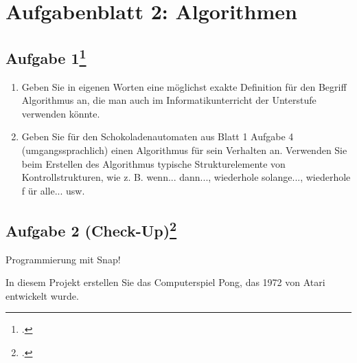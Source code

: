 \documentclass{lehramt-informatik-haupt}
\begin{document}
\chapter{Aufgabenblatt 2: Algorithmen}

%

\section{Aufgabe 1\footcite{oomup:ab:2}}

\begin{enumerate}


\item Geben Sie in eigenen Worten eine möglichst exakte Definition für
den Begriff Algorithmus an, die man auch im Informatikunterricht der
Unterstufe verwenden könnte.


\item Geben Sie für den Schokoladenautomaten aus Blatt 1 Aufgabe 4
(umgangssprachlich) einen Algorithmus für sein Verhalten an. Verwenden
Sie beim Erstellen des Algorithmus typische Strukturelemente von
Kontrollstrukturen, wie z. B. wenn... dann..., wiederhole solange...,
wiederhole f ür alle... usw.
\end{enumerate}

%

\section{Aufgabe 2 (Check-Up)\footcite{oomup:ab:2}}

Programmierung mit Snap!

In diesem Projekt erstellen Sie das Computerspiel Pong, das 1972 von
Atari entwickelt wurde.
\end{document}
